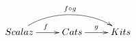 \documentclass{article}
\begin{document}
$$\xymatrix{
Scalaz \ar@(ur,ul)[rr]^{f \circ g} \ar[r]^{f} &
Cats \ar[r]^{g} &
Kits
}$$
\end{document}
